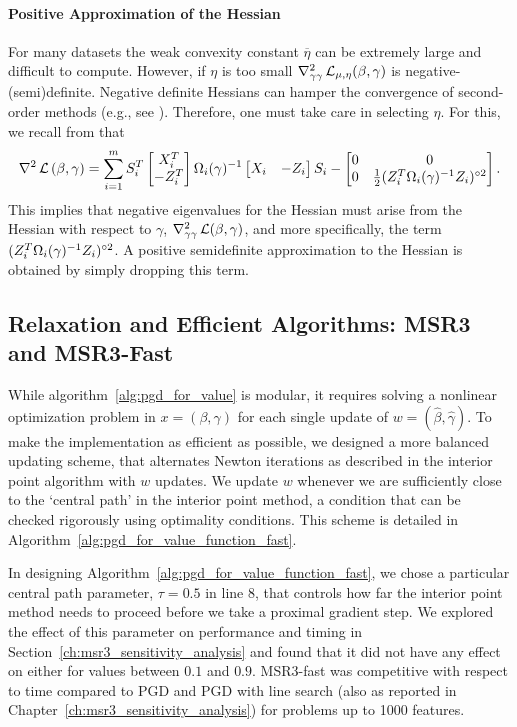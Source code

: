 \paragraph{Positive Approximation of the Hessian}
For many datasets the weak convexity constant $\overline \eta$ can be extremely large 
and difficult to compute. However, if $ \eta$ is too small 
$\nabla^2_{\gamma\gamma}\operatorname{\mathcal{L}}_{\mu,\eta}(\beta, \gamma)$ is 
negative-(semi)definite. Negative definite Hessians can hamper the convergence of 
second-order methods (e.g., see \cite{nocedal2006numerical}). 
Therefore, one must take care in selecting $\eta$. For this, we recall from
\cite[Lemma 3]{Theory1} that
\[
\nabla^2\operatorname{\mathcal{L}}{(\beta,\gamma)}=\sum_{i=1}^m
S_i^T\begin{bmatrix}X_i^T\\ -Z_i^T\end{bmatrix}
\Omega_i(\gamma)^{-1}
\begin{bmatrix}X_i& -Z_i\end{bmatrix}S_i
-\begin{bmatrix}
0&0\\ 0& \frac{1}{2}(Z_i^T\Omega_i(\gamma)^{-1}Z_i)^{\circ2}
\end{bmatrix}.
\]
This implies that negative eigenvalues for the Hessian must arise from the
Hessian with respect to $\gamma$,
$\nabla^2_{\gamma\gamma}\operatorname{\mathcal{L}}(\beta, \gamma)$, and more specifically, the
term $(Z_i^T\Omega_i(\gamma)^{-1}Z_i)^{\circ2}$. 
A positive semidefinite approximation to the Hessian is obtained by simply dropping this term. 


\subsection{Relaxation and Efficient Algorithms: MSR3 and MSR3-Fast }
\label{sec:synthetic}

While algorithm~\eqref{alg:pgd_for_value} is modular, it requires solving a nonlinear optimization problem in $x = (\beta, \gamma)$ for each single update
of $w = (\hat \beta, \hat \gamma)$. To make the implementation as efficient as possible, we designed a more balanced updating scheme, that 
alternates Newton iterations as described in the interior point algorithm with $w$ updates. We update $w$ whenever we are sufficiently close 
to the `central path' in the interior point method, a condition that can be checked rigorously using optimality conditions. 
This scheme is detailed in Algorithm~\ref{alg:pgd_for_value_function_fast}.

In designing Algorithm~\ref{alg:pgd_for_value_function_fast}, we chose a particular central path parameter, $\tau = 0.5$ in line 8, 
that controls how far the interior point method needs to proceed before we take a proximal gradient step. We explored the effect of this parameter
on performance and timing in Section~\ref{ch:msr3_sensitivity_analysis} and found that it did not have any effect on either for values between $0.1$ and $0.9$. MSR3-fast 
was competitive with respect to time compared to PGD and PGD with line search (also as reported in Chapter~\ref{ch:msr3_sensitivity_analysis}) for problems up to 1000 features. 


